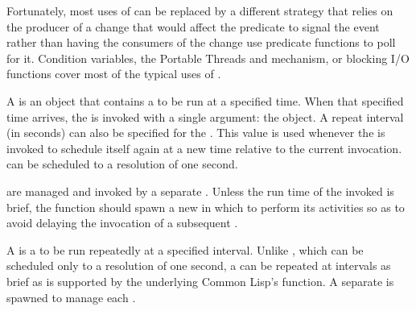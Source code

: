 Fortunately, most uses of  can be replaced by a different
strategy that relies on the producer of a change that would affect the
 predicate  to signal the event rather than
having the consumers of the change use predicate functions to poll for it.
Condition variables, the Portable Threads \textbf{}
and \textbf{} mechanism, or blocking I/O functions
cover most of the typical uses of .


A  is an object that contains a  to
be run at a specified time. When that specified time arrives, the
 is invoked with a single argument: the
 object. A repeat interval (in seconds) can also be
specified for the . This value is used whenever the
 is invoked to schedule itself again at a new time
relative to the current invocation.   can be
scheduled to a resolution of one second.

 are managed and invoked by a separate
 .  Unless the run time of
the invoked  is brief, the function should spawn a new
 in which to perform its activities so as to avoid delaying the
invocation of a subsequent .


A  is a  to be run repeatedly at a
specified interval.  Unlike , which can be
scheduled only to a resolution of one second, a  can
be repeated at intervals as brief as is supported by the underlying Common
Lisp's  function.  A separate  is spawned to manage
each .

\W\entities
\T\clearpage



